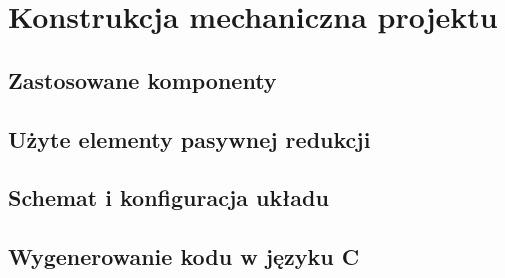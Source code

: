 \chapter{Konstrukcja mechaniczna projektu}
\label{cha:constr}
\section{Zastosowane komponenty}
\label{sec:komponenty}

\section{Użyte elementy pasywnej redukcji}
\label{sec:usedPNC}

\section{Schemat i konfiguracja układu}
\label{sec:config}

\section{Wygenerowanie kodu w języku C}
\label{sec:configGenerate}